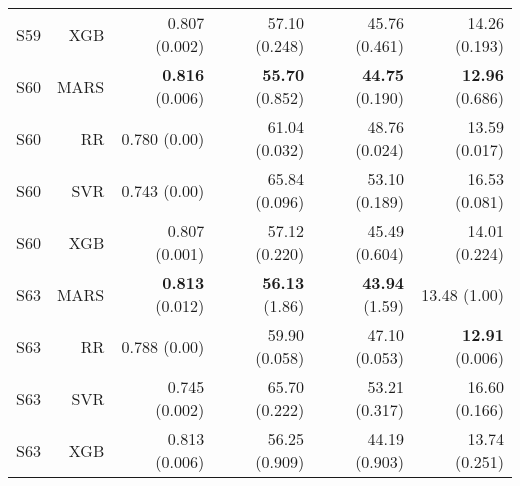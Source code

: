 \begin{table}
\begin{tabular}{rrrrrr}
    S59 &       XGB &        0.807 (0.002) &        57.10 (0.248) &        45.76 (0.461) &        14.26 (0.193) \\
    S60 &      MARS & { \bf 0.816} (0.006) & { \bf 55.70} (0.852) & { \bf 44.75} (0.190) & { \bf 12.96} (0.686) \\
    S60 &        RR &         0.780 (0.00) &        61.04 (0.032) &        48.76 (0.024) &        13.59 (0.017) \\
    S60 &       SVR &         0.743 (0.00) &        65.84 (0.096) &        53.10 (0.189) &        16.53 (0.081) \\
    S60 &       XGB &        0.807 (0.001) &        57.12 (0.220) &        45.49 (0.604) &        14.01 (0.224) \\
    S63 &      MARS & { \bf 0.813} (0.012) &  { \bf 56.13} (1.86) &  { \bf 43.94} (1.59) &         13.48 (1.00) \\
    S63 &        RR &         0.788 (0.00) &        59.90 (0.058) &        47.10 (0.053) & { \bf 12.91} (0.006) \\
    S63 &       SVR &        0.745 (0.002) &        65.70 (0.222) &        53.21 (0.317) &        16.60 (0.166) \\
    S63 &       XGB &        0.813 (0.006) &        56.25 (0.909) &        44.19 (0.903) &        13.74 (0.251) \\
\bottomrule
\end{tabular}
\end{table}
